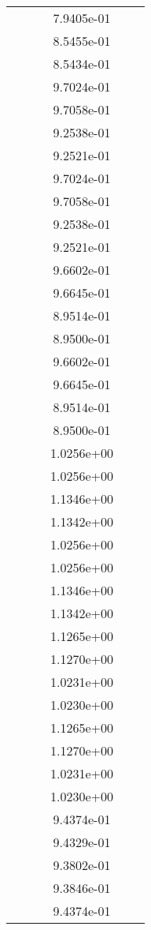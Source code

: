 \begin{xltabular}{\textwidth}{r|rS[table-format=1.3e+2]S[table-format=1.4e+2]S[table-format=1.4e+2]S[table-format=-1.5]}
&  &  & 7.9405e-01 & & \\
&  &  & 8.5455e-01 & & \\
&  &  & 8.5434e-01 & & \\
&  &  & 9.7024e-01 & & \\
&  &  & 9.7058e-01 & & \\
&  &  & 9.2538e-01 & & \\
&  &  & 9.2521e-01 & & \\
&  &  & 9.7024e-01 & & \\
&  &  & 9.7058e-01 & & \\
&  &  & 9.2538e-01 & & \\
&  &  & 9.2521e-01 & & \\
&  &  & 9.6602e-01 & & \\
&  &  & 9.6645e-01 & & \\
&  &  & 8.9514e-01 & & \\
&  &  & 8.9500e-01 & & \\
&  &  & 9.6602e-01 & & \\
&  &  & 9.6645e-01 & & \\
&  &  & 8.9514e-01 & & \\
&  &  & 8.9500e-01 & & \\
&  &  & 1.0256e+00 & & \\
&  &  & 1.0256e+00 & & \\
&  &  & 1.1346e+00 & & \\
&  &  & 1.1342e+00 & & \\
&  &  & 1.0256e+00 & & \\
&  &  & 1.0256e+00 & & \\
&  &  & 1.1346e+00 & & \\
&  &  & 1.1342e+00 & & \\
&  &  & 1.1265e+00 & & \\
&  &  & 1.1270e+00 & & \\
&  &  & 1.0231e+00 & & \\
&  &  & 1.0230e+00 & & \\
&  &  & 1.1265e+00 & & \\
&  &  & 1.1270e+00 & & \\
&  &  & 1.0231e+00 & & \\
&  &  & 1.0230e+00 & & \\
&  &  & 9.4374e-01 & & \\
&  &  & 9.4329e-01 & & \\
&  &  & 9.3802e-01 & & \\
&  &  & 9.3846e-01 & & \\
&  &  & 9.4374e-01 & & \\

\end{xltabular}
